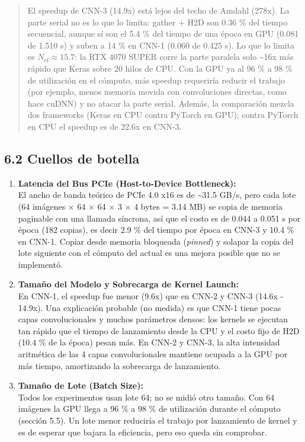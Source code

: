 \documentclass[
  11pt,
]{article}
\begin{document}
\begin{quote}
El speedup de CNN-3 (14.9x) está lejos del techo de
Amdahl (278x). La parte serial no es lo que lo limita:
gather + H2D son 0.36 \% del tiempo secuencial, aunque sí
son el 5.4 \% del tiempo de una época en GPU (0.081 de 1.510
s) y suben a 14 \% en CNN-1 (0.060 de 0.425 s). Lo que lo
limita es \(N_{\text{ef}} \approx 15.7\): la RTX 4070 SUPER
corre la parte paralela solo \textasciitilde16x más rápido
que Keras sobre 20 hilos de CPU. Con la GPU ya al 96 \% a 98
\% de utilización en el cómputo, más speedup requeriría
reducir el trabajo (por ejemplo, menos memoria movida con
convoluciones directas, como hace cuDNN) y no atacar la
parte serial. Además, la comparación mezcla dos frameworks
(Keras en CPU contra PyTorch en GPU); contra PyTorch en CPU
el speedup es de 22.6x en CNN-3.
\end{quote}

\subsection{6.2 Cuellos de botella}\label{cuellos-de-botella-y-limitantes-de-escalamiento}

\begin{enumerate}
\def\labelenumi{\arabic{enumi}.}
\item
  \textbf{Latencia del Bus PCIe (Host-to-Device
  Bottleneck):}\\
  El ancho de banda teórico de PCIe 4.0 x16 es de
  \textasciitilde31.5 GB/s, pero cada lote (64 imágenes
  \(\times\) 64 \(\times\) 64 \(\times\) 3 \(\times\) 4
  bytes = 3.14 MB) se copia de memoria paginable con una
  llamada síncrona, así que el costo es de 0.044 a 0.051 s
  por época (182 copias), es decir 2.9 \% del tiempo por
  época en CNN-3 y 10.4 \% en CNN-1. Copiar desde memoria
  bloqueada (\emph{pinned}) y solapar la copia del lote
  siguiente con el cómputo del actual es una mejora posible
  que no se implementó.
\item
  \textbf{Tamaño del Modelo y Sobrecarga de Kernel
  Launch:}\\
  En CNN-1, el speedup fue menor (9.6x) que en CNN-2 y CNN-3
  (14.6x - 14.9x). Una explicación probable (no medida) es
  que CNN-1 tiene pocas capas convolucionales y muchos
  parámetros densos: los kernels se ejecutan tan rápido que
  el tiempo de lanzamiento desde la CPU y el costo fijo de
  H2D (10.4 \% de la época) pesan más. En CNN-2 y CNN-3, la
  alta intensidad aritmética de las 4 capas convolucionales
  mantiene ocupada a la GPU por más tiempo, amortizando la
  sobrecarga de lanzamiento.
\item
  \textbf{Tamaño de Lote (Batch Size):}\\
  Todos los experimentos usan lote 64; no se midió otro
  tamaño. Con 64 imágenes la GPU llega a 96 \% a 98 \% de
  utilización durante el cómputo (sección 5.5). Un lote
  menor reduciría el trabajo por lanzamiento de kernel y es
  de esperar que bajara la eficiencia, pero eso queda sin
  comprobar.
\end{enumerate}
\end{document}
